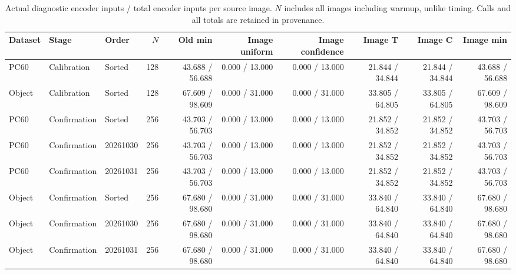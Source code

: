 \begin{table}[t]
\caption{Actual diagnostic encoder inputs / total encoder inputs per source image. $N$ includes all images including warmup, unlike timing. Calls and all totals are retained in provenance.}
\centering\scriptsize
\begin{tabular}{@{}lllrrrrrrr@{}}
\toprule
Dataset & Stage & Order & $N$ & Old min & Image uniform & Image confidence & Image T & Image C & Image min \\
\midrule
PC60 & Calibration & Sorted & 128 & 43.688 / 56.688 & 0.000 / 13.000 & 0.000 / 13.000 & 21.844 / 34.844 & 21.844 / 34.844 & 43.688 / 56.688 \\
Object & Calibration & Sorted & 128 & 67.609 / 98.609 & 0.000 / 31.000 & 0.000 / 31.000 & 33.805 / 64.805 & 33.805 / 64.805 & 67.609 / 98.609 \\
PC60 & Confirmation & Sorted & 256 & 43.703 / 56.703 & 0.000 / 13.000 & 0.000 / 13.000 & 21.852 / 34.852 & 21.852 / 34.852 & 43.703 / 56.703 \\
PC60 & Confirmation & 20261030 & 256 & 43.703 / 56.703 & 0.000 / 13.000 & 0.000 / 13.000 & 21.852 / 34.852 & 21.852 / 34.852 & 43.703 / 56.703 \\
PC60 & Confirmation & 20261031 & 256 & 43.703 / 56.703 & 0.000 / 13.000 & 0.000 / 13.000 & 21.852 / 34.852 & 21.852 / 34.852 & 43.703 / 56.703 \\
Object & Confirmation & Sorted & 256 & 67.680 / 98.680 & 0.000 / 31.000 & 0.000 / 31.000 & 33.840 / 64.840 & 33.840 / 64.840 & 67.680 / 98.680 \\
Object & Confirmation & 20261030 & 256 & 67.680 / 98.680 & 0.000 / 31.000 & 0.000 / 31.000 & 33.840 / 64.840 & 33.840 / 64.840 & 67.680 / 98.680 \\
Object & Confirmation & 20261031 & 256 & 67.680 / 98.680 & 0.000 / 31.000 & 0.000 / 31.000 & 33.840 / 64.840 & 33.840 / 64.840 & 67.680 / 98.680 \\
\bottomrule
\end{tabular}
\end{table}
